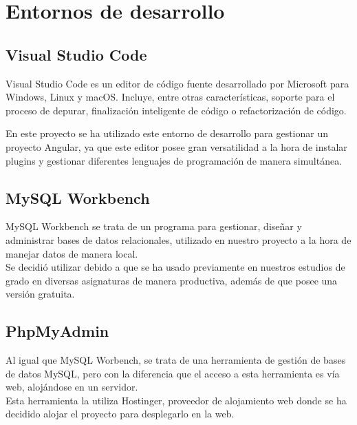      \section{Entornos de desarrollo}
     
     \subsection{Visual Studio Code}
     Visual Studio Code\cite{vsc} es un editor de código fuente desarrollado por Microsoft para Windows, Linux y macOS. Incluye, entre otras características, soporte para el proceso de depurar, finalización inteligente de código o refactorización de código.
    \newline
    
    En este proyecto se ha utilizado este entorno de desarrollo para gestionar un proyecto Angular, ya que este editor posee gran versatilidad a la hora de instalar plugins y gestionar diferentes lenguajes de programación de manera simultánea.
    
     \subsection{MySQL Workbench}
     MySQL Workbench\cite{mysql} se trata de un programa para gestionar, diseñar y administrar bases de datos relacionales, utilizado en nuestro proyecto a la hora de manejar datos de manera local. \\
     \newline
     Se decidió utilizar debido a que se ha usado previamente en nuestros estudios de grado en diversas asignaturas de manera productiva, además de que posee una versión gratuita.
     
     \subsection{PhpMyAdmin}
     Al igual que MySQL Worbench, se trata de una herramienta de gestión de bases de datos MySQL, pero con la diferencia que el acceso a esta herramienta es vía web, alojándose en un servidor.\\
     \newline
     Esta herramienta la utiliza Hostinger\cite{hostinger},  proveedor de alojamiento web donde se ha decidido alojar el proyecto para desplegarlo en la web.
     
